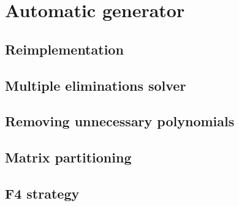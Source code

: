 \chapter{Automatic generator}

\section{Reimplementation}

\section{Multiple eliminations solver}

\section{Removing unnecessary polynomials}

\section{Matrix partitioning}

\section{F4 strategy}
